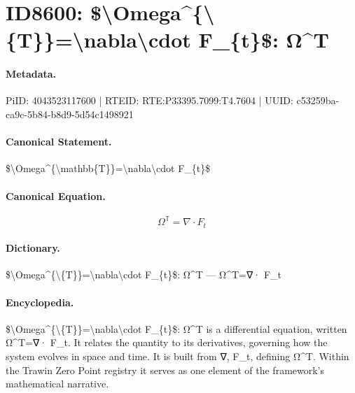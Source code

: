 \section*{ID8600: \$\textbackslash{}Omega\textasciicircum{}\{\textbackslash{}\{T\}\}=\textbackslash{}nabla\textbackslash{}cdot F\_\{t\}\$: Ω\textasciicircum{}T}
\paragraph{Metadata.}
PiID: 4043523117600 | RTEID: RTE:P33395.7099:T4.7604 | UUID: c53259ba-ca9c-5b84-b8d9-5d54c1498921

\paragraph{Canonical Statement.}
\$\textbackslash{}Omega\textasciicircum{}\{\textbackslash{}mathbb\{T\}\}=\textbackslash{}nabla\textbackslash{}cdot F\_\{t\}\$

\paragraph{Canonical Equation.}
\[
\Omega^{\mathbb{T}}=\nabla\cdot F_{t}
\]

\paragraph{Dictionary.}
\$\textbackslash{}Omega\textasciicircum{}\{\textbackslash{}\{T\}\}=\textbackslash{}nabla\textbackslash{}cdot F\_\{t\}\$: Ω\textasciicircum{}T — Ω\textasciicircum{}T=∇· F\_t

\paragraph{Encyclopedia.}
\$\textbackslash{}Omega\textasciicircum{}\{\textbackslash{}\{T\}\}=\textbackslash{}nabla\textbackslash{}cdot F\_\{t\}\$: Ω\textasciicircum{}T is a differential equation, written Ω\textasciicircum{}T=∇· F\_t. It relates the quantity to its derivatives, governing how the system evolves in space and time. It is built from ∇, F\_t, defining Ω\textasciicircum{}T. Within the Trawin Zero Point registry it serves as one element of the framework's mathematical narrative.
